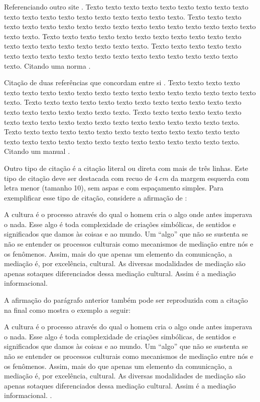     Referenciando outro site \cite{secretaria1999}. Texto texto texto texto texto texto texto texto texto texto texto texto texto texto texto texto texto texto texto. Texto texto texto texto texto texto texto texto texto texto texto texto texto texto texto texto texto texto texto. Texto texto texto texto texto texto texto texto texto texto texto texto texto texto texto texto texto texto texto. Texto texto texto texto texto texto texto texto texto texto texto texto texto texto texto texto texto texto texto. Citando uma norma \cite{NBR10520:2002}.
        
    Citação de duas referências que concordam entre si \cite{Almeida2018,Gondim2017}. Texto texto texto texto texto texto texto texto texto texto texto texto texto texto texto texto texto texto texto. Texto texto texto texto texto texto texto texto texto texto texto texto texto texto texto texto texto texto texto. Texto texto texto texto texto texto texto texto texto texto texto texto texto texto texto texto texto texto texto. Texto texto texto texto texto texto texto texto texto texto texto texto texto texto texto texto texto texto texto texto texto texto texto texto texto texto. Citando um manual \cite{manuais1989}. 
        
    Outro tipo de citação é a citação literal ou direta com mais de três linhas. Este tipo de citação deve ser destacada com recuo de $4~cm$ da margem esquerda com letra menor (tamanho 10), sem aspas e com espaçamento simples.  Para exemplificar esse tipo de citação, considere a afirmação de :
    \begin{citacao}
        A cultura é o processo através do qual o homem cria o algo onde antes imperava o nada. Esse algo é toda complexidade de criações simbólicas, de sentidos e significados que damos às coisas e ao mundo. Um ``algo'' que não se sustenta se não se entender os processos culturais como mecanismos de mediação entre nós e os fenômenos. Assim, mais do que apenas um elemento da comunicação, a mediação é, por excelência, cultural. As diversas modalidades de mediação são apenas sotaques diferenciados dessa mediação cultural. Assim é a mediação informacional.
    \end{citacao}
        
    A afirmação do parágrafo anterior também pode ser reproduzida com a citação na final como mostra o exemplo a seguir: 
    \begin{citacao}
        A cultura é o processo através do qual o homem cria o algo onde antes imperava o nada. Esse algo é toda complexidade de criações simbólicas, de sentidos e significados que damos às coisas e ao mundo. Um “algo” que não se sustenta se não se entender os processos culturais como mecanismos de mediação entre nós e os fenômenos. Assim, mais do que apenas um elemento da comunicação, a mediação é, por excelência, cultural. As diversas modalidades de mediação são apenas sotaques diferenciados dessa mediação cultural. Assim é a mediação informacional. \cite{feitosa2016}.
    \end{citacao}
        
